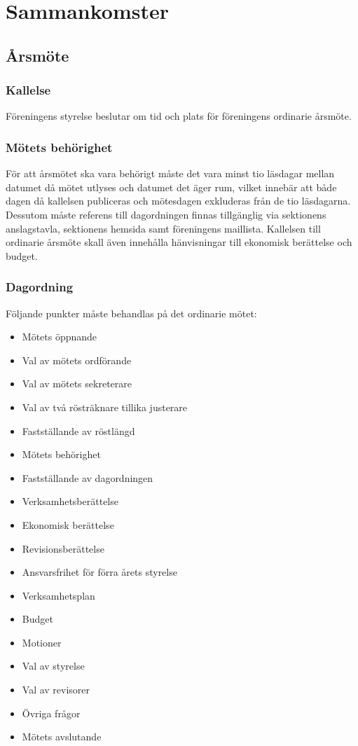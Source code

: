 \section{Sammankomster}

\subsection{Årsmöte}

\subsubsection{Kallelse}
Föreningens styrelse beslutar om tid och plats för föreningens ordinarie årsmöte.

\subsubsection{Mötets behörighet} \label{sec:mötets-behörighet}
För att årsmötet ska vara behörigt måste det vara minst tio läsdagar mellan datumet då mötet utlyses och datumet det äger rum, vilket innebär att både dagen då kallelsen publiceras och mötesdagen exkluderas från de tio läsdagarna. Dessutom måste referens till dagordningen finnas tillgänglig via sektionens anslagstavla, sektionens hemsida samt föreningens maillista. Kallelsen till ordinarie årsmöte skall även innehålla hänvisningar till ekonomisk berättelse och budget.

\subsubsection{Dagordning}
Följande punkter måste behandlas på det ordinarie mötet:
\begin{itemize}
    \item Mötets öppnande
    \item Val av mötets ordförande
    \item Val av mötets sekreterare
    \item Val av två rösträknare tillika justerare
    \item Fastställande av röstlängd
    \item Mötets behörighet
    \item Fastställande av dagordningen
    \item Verksamhetsberättelse
    \item Ekonomisk berättelse
    \item Revisionsberättelse
    \item Ansvarsfrihet för förra årets styrelse
    \item Verksamhetsplan
    \item Budget
    \item Motioner
    \item Val av styrelse
    \item Val av revisorer
    \item Övriga frågor
    \item Mötets avslutande
\end{itemize}

